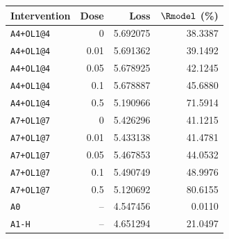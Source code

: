 \begin{tabular}{lrrr}
\toprule
Intervention & Dose & Loss & $\Rmodel$ (\%) \\
\midrule
\texttt{A4+OL1@4} & 0 & 5.692075 & 38.3387 \\
\texttt{A4+OL1@4} & 0.01 & 5.691362 & 39.1492 \\
\texttt{A4+OL1@4} & 0.05 & 5.678925 & 42.1245 \\
\texttt{A4+OL1@4} & 0.1 & 5.678887 & 45.6880 \\
\texttt{A4+OL1@4} & 0.5 & 5.190966 & 71.5914 \\
\texttt{A7+OL1@7} & 0 & 5.426296 & 41.1215 \\
\texttt{A7+OL1@7} & 0.01 & 5.433138 & 41.4781 \\
\texttt{A7+OL1@7} & 0.05 & 5.467853 & 44.0532 \\
\texttt{A7+OL1@7} & 0.1 & 5.490749 & 48.9976 \\
\texttt{A7+OL1@7} & 0.5 & 5.120692 & 80.6155 \\
\texttt{A0} & -- & 4.547456 & 0.0110 \\
\texttt{A1-H} & -- & 4.651294 & 21.0497 \\
\bottomrule
\end{tabular}

